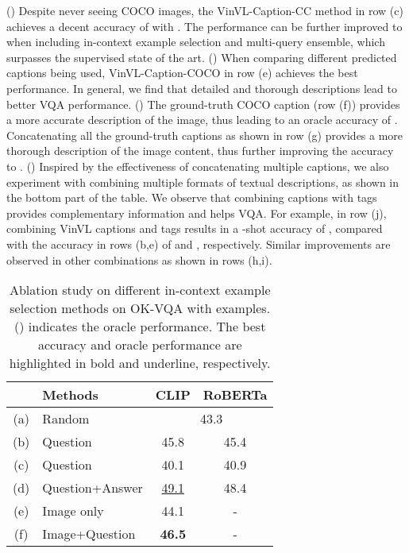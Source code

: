 () Despite never seeing COCO images, the VinVL-Caption-CC method in row (c) achieves a decent accuracy of  with . The performance can be further improved to  when including in-context example selection and multi-query ensemble, which surpasses the supervised state of the art.
() When comparing different predicted captions being used, VinVL-Caption-COCO in row (e) achieves the best performance. In general, we find that detailed and thorough descriptions lead to better VQA performance.
() The ground-truth COCO caption (row (f)) provides a more accurate description of the image, thus leading to an oracle accuracy of . Concatenating all the ground-truth captions as shown in row (g) provides a more thorough description of the image content, thus further improving the accuracy to .
() Inspired by the effectiveness of concatenating multiple captions, we also experiment with combining multiple formats of textual descriptions, as shown in the bottom part of the table. We observe that combining captions with tags provides complementary information and helps VQA. For example, in row (j), combining VinVL captions and tags results in a -shot accuracy of , compared with the accuracy in rows (b,e) of  and , respectively. Similar improvements are observed in other combinations as shown in rows (h,i).

\begin{table}[t]
\small \centering
\begin{tabular}{ c l || c c }
    \hline
    & Methods & CLIP & RoBERTa \\
    \hline
    (a) & Random & \multicolumn{2}{c}{43.3}  \\
    (b) & Question & 45.8 & 45.4 \\
    (c) & Question & 40.1 & 40.9 \\
    (d) & Question+Answer & \underline{49.1} & 48.4 \\
    \hline
    (e) & Image only & 44.1 & - \\
    (f) & Image+Question & \textbf{46.5} & - \\
    \hline\end{tabular}
\vspace{-2mm}
\caption{\small Ablation study on different in-context example selection methods on OK-VQA with  examples. () indicates the oracle performance. The best accuracy and oracle performance are highlighted in bold and underline, respectively.}
\label{table:qaselect}
\vspace{-2mm}
\end{table}


